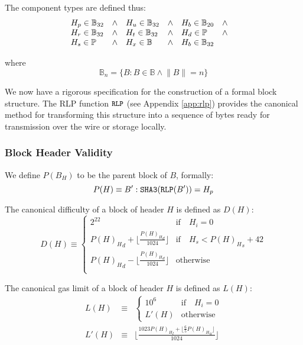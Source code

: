 \documentclass[9pt,oneside]{amsart}
\begin{document}
\begin{multicols}{2}
The component types are defined thus:
\begin{equation}
\begin{array}[t]{lclclcl}
H_p \in \mathbb{B}_{32} & \wedge & H_u \in \mathbb{B}_{32} & \wedge & H_b \in \mathbb{B}_{20} & \wedge \\
H_r \in \mathbb{B}_{32} & \wedge & H_t \in \mathbb{B}_{32} & \wedge & H_d \in \mathbb{P} & \wedge \\
H_s \in \mathbb{P} & \wedge & H_x \in \mathbb{B} & \wedge & H_b \in \mathbb{B}_{32} &&
\end{array}
\end{equation}

where
\begin{equation}
\mathbb{B}_n = \{ B: B \in \mathbb{B} \wedge \lVert B \rVert = n \}
\end{equation}

We now have a rigorous specification for the construction of a formal block structure. The RLP function $\texttt{\small RLP}$ (see Appendix \ref{app:rlp}) provides the canonical method for transforming this structure into a sequence of bytes ready for transmission over the wire or storage locally.

\subsubsection{Block Header Validity}

We define $P(B_H)$ to be the parent block of $B$, formally:
\begin{equation}
P(H) \equiv B': \mathtt{\tiny SHA3}(\mathtt{\tiny RLP}(B')) = H_p
\end{equation}

The canonical difficulty of a block of header $H$ is defined as $D(H)$:
\begin{equation}
D(H) \equiv \begin{cases}
2^{22} & \text{if} \quad H_i = 0\\
{P(H)_H}_d + \lfloor\frac{{P(H)_H}_d}{1024}\rfloor & \text{if} \quad H_s < {P(H)_H}_s + 42\\
{P(H)_H}_d - \lfloor\frac{{P(H)_H}_d}{1024}\rfloor & \text{otherwise}\\
\end{cases}
\end{equation}

The canonical gas limit of a block of header $H$ is defined as $L(H)$:
\begin{eqnarray}
L(H) & \equiv & \begin{cases}
10^6 & \text{if} \quad H_i = 0\\
L'(H) & \text{otherwise}
\end{cases}\\
L'(H) & \equiv & \big\lfloor \frac{1023 {P(H)_H}_l + \lfloor \frac{6}{5}{P(H)_H}_u \rfloor}{1024}\big\rfloor
\end{eqnarray}


\end{multicols}
\end{document}
